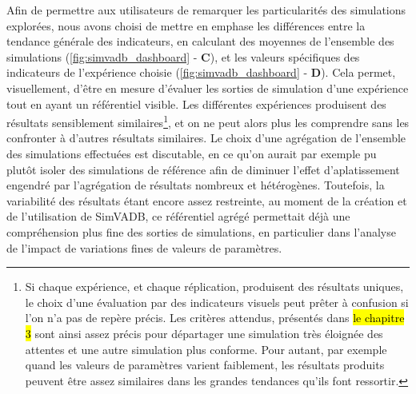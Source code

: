 Afin de permettre aux utilisateurs de remarquer les particularités des simulations explorées, nous avons choisi de mettre en emphase les différences entre la tendance générale des indicateurs, en calculant des moyennes de l'ensemble des simulations (\cref{fig:simvadb_dashboard} - \textbf{C}), et les valeurs spécifiques des indicateurs de l'expérience choisie (\cref{fig:simvadb_dashboard} - \textbf{D}).
Cela permet, visuellement, d'être en mesure d'évaluer les sorties de simulation d'une expérience tout en ayant un référentiel visible.
Les différentes expériences produisent des résultats sensiblement similaires\footnote{
	Si chaque expérience, et chaque réplication, produisent des résultats uniques, le choix d'une évaluation par des indicateurs visuels peut prêter à confusion si l'on n'a pas de repère précis.
	Les critères attendus, présentés dans \hl{le chapitre 3} sont ainsi assez précis pour départager une simulation très éloignée des attentes et une autre simulation plus conforme.
	Pour autant, par exemple quand les valeurs de paramètres varient faiblement, les résultats produits peuvent être assez similaires dans les grandes tendances qu'ils font ressortir.
}, et on ne peut alors plus les comprendre sans les confronter à d'autres résultats similaires.
Le choix d'une agrégation de l'ensemble des simulations effectuées est discutable, en ce qu'on aurait par exemple pu plutôt isoler des simulations \og de référence \fg{} afin de diminuer l'effet \og d'aplatissement \fg{} engendré par l'agrégation de résultats nombreux et hétérogènes.
Toutefois, la variabilité des résultats étant encore assez restreinte, au moment de la création et de l'utilisation de SimVADB, ce référentiel agrégé permettait déjà une compréhension plus fine des sorties de simulations, en particulier dans l'analyse de l'impact de variations fines de valeurs de paramètres.

